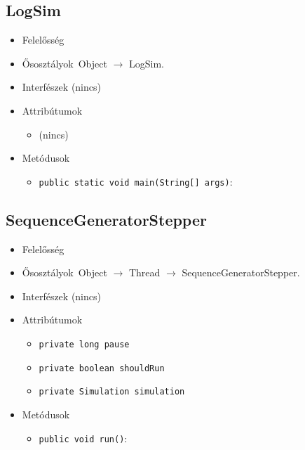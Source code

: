 \subsection{LogSim}
\begin{itemize}
\item Felelősség\\

\item Ősosztályok\ Object $\rightarrow{}$ LogSim.
\item Interfészek (nincs)
\item Attribútumok $\ $
\begin{itemize}
\item (nincs)
\end{itemize}
\item Metódusok$\ $
\begin{itemize}
	\item \texttt{public static void main(String[] args)}: 
\end{itemize}
\end{itemize}

\subsection{SequenceGeneratorStepper}
\begin{itemize}
\item Felelősség\\

\item Ősosztályok\ Object $\rightarrow{}$ Thread $\rightarrow{}$ SequenceGeneratorStepper.
\item Interfészek (nincs)
\item Attribútumok $\ $
\begin{itemize}
	\item \texttt{private long pause} 
	\item \texttt{private boolean shouldRun} 
	\item \texttt{private Simulation simulation} 
\end{itemize}
\item Metódusok$\ $
\begin{itemize}
	\item \texttt{public void run()}: 
\end{itemize}
\end{itemize}


